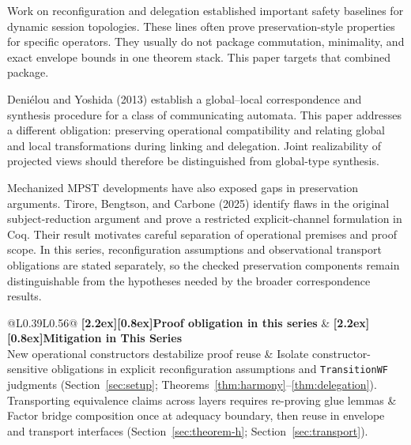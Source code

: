 \documentclass[a4paper,10pt,twocolumn,english]{article}
\numberwithin{equation}{section}
\theoremstyle{paperdef}
\theoremstyle{paperplain}
\theoremstyle{paperdef}
\theoremstyle{paperremark}
\theoremstyle{paperdef}
\newcommand{\thead}[1]{\textbf{\raisebox{0pt}[2.2ex][0.8ex]{#1}}}
\begin{document}
Work on reconfiguration and delegation established important safety baselines for dynamic session topologies. These lines often prove preservation-style properties for specific operators. They usually do not package commutation, minimality, and exact envelope bounds in one theorem stack. This paper targets that combined package.

Deni\'{e}lou and Yoshida (2013) establish a global--local correspondence and synthesis procedure
for a class of communicating automata. This paper addresses a different obligation: preserving
operational compatibility and relating global and local transformations during linking and
delegation. Joint realizability of projected views should therefore be distinguished from global-type
synthesis.

Mechanized MPST developments have also exposed gaps in preservation arguments. Tirore, Bengtson,
and Carbone (2025) identify flaws in the original subject-reduction argument and prove a restricted
explicit-channel formulation in Coq. Their result motivates careful separation of operational
premises and proof scope. In this series, reconfiguration assumptions and observational transport
obligations are stated separately, so the checked preservation components remain distinguishable
from the hypotheses needed by the broader correspondence results.
\begin{table}[H]
	\centering
	\footnotesize
	\begin{tabularx}{\columnwidth}{@{}L{0.39\columnwidth}L{0.56\columnwidth}@{}}
		\toprule
		\thead{Proof obligation in this series}                                   & \thead{Mitigation in This Series}                                                                                                                                                                  \\
		\midrule
		New operational constructors destabilize proof reuse                          & Isolate constructor-sensitive obligations in explicit reconfiguration assumptions and \texttt{TransitionWF} judgments (Section~\ref{sec:setup}; Theorems~\ref{thm:harmony}--\ref{thm:delegation}). \\
		Transporting equivalence claims across layers requires re-proving glue lemmas & Factor bridge composition once at adequacy boundary, then reuse in envelope and transport interfaces (Section~\ref{sec:theorem-h}; Section~\ref{sec:transport}).                                   \\
		\bottomrule
	\end{tabularx}
	\caption{Proof-organization choices for reconfiguration and observational transport in this series.}
	\label{tab:p3-tirore-mitigation}
\end{table}
\end{document}

